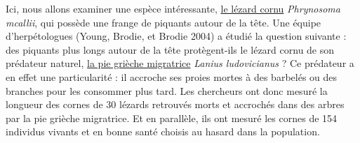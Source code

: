 \documentclass[
  a4paper,
  DIV=11,
  numbers=noendperiod,
  oneside]{scrreprt}
\begin{document}
Ici, nous allons examiner une espèce intéressante,
\href{https://fr.wikipedia.org/wiki/Phrynosoma_mcallii}{le lézard cornu}
\emph{Phrynosoma mcallii}, qui possède une frange de piquants autour de
la tête. Une équipe d'herpétologues (Young, Brodie, et Brodie 2004) a
étudié la question suivante : des piquants plus longs autour de la tête
protègent-ils le lézard cornu de son prédateur naturel,
\href{https://fr.wikipedia.org/wiki/Pie-grièche_migratrice}{la pie
grièche migratrice} \emph{Lanius ludovicianus} ? Ce prédateur a en effet
une particularité : il accroche ses proies mortes à des barbelés ou des
branches pour les consommer plus tard. Les chercheurs ont donc mesuré la
longueur des cornes de 30 lézards retrouvés morts et accrochés dans des
arbres par la pie grièche migratrice. Et en parallèle, ils ont mesuré
les cornes de 154 individus vivants et en bonne santé choisis au hasard
dans la population.
\end{document}
